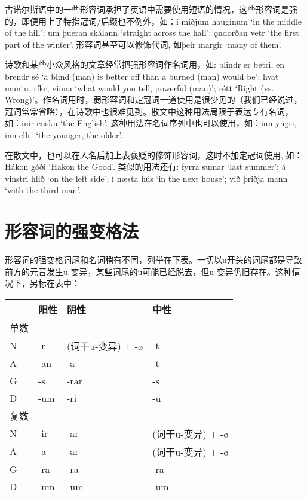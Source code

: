 古诺尔斯语中的一些形容词承担了英语中需要使用短语的情况，这些形容词是强的，即便用上了特指冠词/后缀也不例外，如：í
miðjum hauginum `in the middle of the hill‌'; um þueran skálann `straight
across the hall‌'; ǫndorðan vetr `the first part of the winter‌'.
形容词甚至可以修饰代词, 如þeir margir `many of them‌'.

诗歌和某些小众风格的文章经常把强形容词作名词用，如: blindr er betri, en
brendr sé `a blind (man) is better off than a burned (man) would be‌';
hvat muntu, ríkr, vinna `what would you tell, powerful (man)‌'; rétt
`Right (vs.
Wrong)‌'。作名词用时，弱形容词和定冠词一道使用是很少见的（我们已经说过，冠词常常省略），在诗歌中也很难见到。散文中这种用法局限于表达专有名词，如：inir
ensku `the English‌'. 这种用法在名词序列中也可以使用，如：inn yngri, inn
ellri `the younger, the older‌'.

在散文中，也可以在人名后加上表褒贬的修饰形容词，这时不加定冠词使用,
如：Hákon góði `Hakon the Good‌'. 类似的用法还有: fyrra sumar `last
summer‌'; á vinstri hlið `on the left side‌'; í næsta hús `in the next
house‌'; við þriðja mann `with the third man‌'.

\section{形容词的强变格法}\label{形容词的强变格法}

形容词的强变格词尾和名词稍有不同，列举在下表。一切以u开头的词尾都是导致前方的元音发生u-变异，某些词尾的u可能已经脱去，但u-变异仍旧存在。这种情况下，另标在表中：

\begin{longtable}{llll}
  \toprule
     & 阳性  & 阴性            & 中性            \\
  \midrule
  \endhead
  \bottomrule
  \endfoot
  单数 &     &               &               \\
  N  & -r  & (词干u-变异) + -ø & -t            \\
  A  & -an & -a            & -t            \\
  G  & -s  & -rar          & -s            \\
  D  & -um & -ri           & -u            \\
  复数 &     &               &               \\
  N  & -ir & -ar           & (词干u-变异) + -ø \\
  A  & -a  & -ar           & (词干u-变异) + -ø \\
  G  & -ra & -ra           & -ra           \\
  D  & -um & -um           & -um           \\
\end{longtable}

